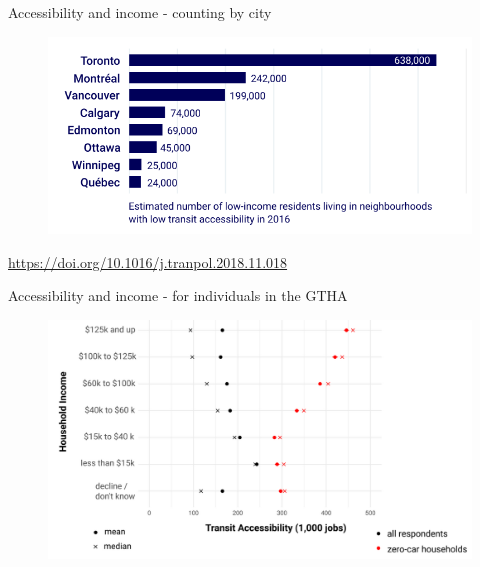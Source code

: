\documentclass[aspectratio=169]{beamer}
\begin{document}
\begin{frame}
	
	Accessibility and income - counting by city
	
	\begin{figure}
		\centering
		\includegraphics[width=0.74\linewidth]{images/tpov_city_plot.png}
	\end{figure}

	\tiny\url{https://doi.org/10.1016/j.tranpol.2018.11.018}
	
\end{frame}




\begin{frame}
	
	Accessibility and income - for individuals in the GTHA
	
	\begin{figure}
		\centering
		\includegraphics[width=0.94\linewidth]{images/income_transit_gtha.png}
	\end{figure}
	
\end{frame}
\end{document}
